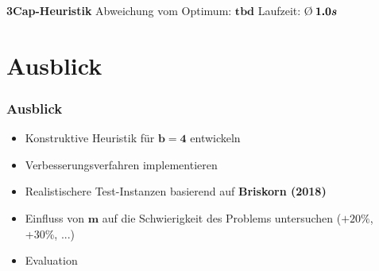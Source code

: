 \documentclass{beamer}
\begin{document}
\begin{frame}
\begin{figure}
\begin{subfigure}[b]{0.3\textwidth}
\end{subfigure}
\begin{subfigure}[b]{0.3\textwidth}
\centering
{}
\end{subfigure}
\begin{subfigure}[b]{0.3\textwidth}
\centering
{}
\end{subfigure}
\end{figure}
\centering
\textbf{3Cap-Heuristik}\linebreak
\centering
Abweichung vom Optimum: $\boldsymbol{tbd}$\linebreak
\centering
Laufzeit: \O $\thinspace \boldsymbol{1.0 s}$

\end{frame}

\section{Ausblick}

\begin{frame}
\frametitle{Ausblick}
\begin{itemize}
  \item Konstruktive Heuristik für $\boldsymbol{b = 4}$ entwickeln
  \item Verbesserungsverfahren implementieren
  \item Realistischere Test-Instanzen basierend auf \textbf{Briskorn (2018)}
  \item Einfluss von $\boldsymbol{m}$ auf die Schwierigkeit des Problems untersuchen ($+20\%$, +30\%, ...)
  \item Evaluation
\end{itemize}
\end{frame}
\end{document}

